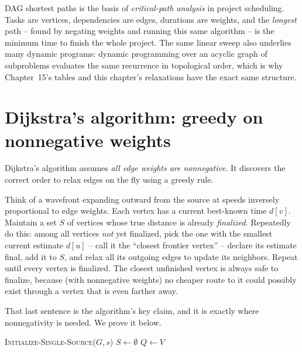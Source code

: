 \begin{aestheticbox}
DAG shortest paths is the basis of \emph{critical-path analysis} in project
scheduling. Tasks are vertices, dependencies are edges, durations
are weights, and the \emph{longest} path -- found by negating weights and running
this same algorithm -- is the minimum time to finish the whole project. The same
linear sweep also underlies many dynamic programs: dynamic programming over an
acyclic graph of subproblems evaluates the same recurrence in topological order,
which is why Chapter~15's tables and this chapter's relaxations have the exact
same structure.
\end{aestheticbox}

\section{Dijkstra's algorithm: greedy on nonnegative weights}

Dijkstra's algorithm assumes \emph{all edge weights are
nonnegative}. It discovers the correct order to relax edges on
the fly using a greedy rule.

\begin{intuitionbox}
Think of a wavefront expanding outward from the source at speeds inversely
proportional to edge weights.
Each vertex has a current best-known time $d[v]$. Maintain a set $S$ of vertices
whose true distance is already \emph{finalized}. Repeatedly do this: among all
vertices \emph{not} yet finalized, pick the one with the smallest current estimate
$d[u]$ -- call it the ``closest frontier vertex'' -- declare its estimate final,
add it to $S$, and relax all its outgoing edges to update its neighbors. Repeat
until every vertex is finalized. The closest unfinished vertex is always safe to
finalize, because (with nonnegative weights) no cheaper route to it could possibly
exist through a vertex that is even farther away.
\end{intuitionbox}

That last sentence is the algorithm's key claim, and it is exactly where
nonnegativity is needed. We prove it below.

\begin{algorithm}[H]
\caption{\textsc{Dijkstra}($G, w, s$)}
\textsc{Initialize-Single-Source}($G,s$)\;
$S \leftarrow \emptyset$\;
$Q \leftarrow V$ 
\end{algorithm}

